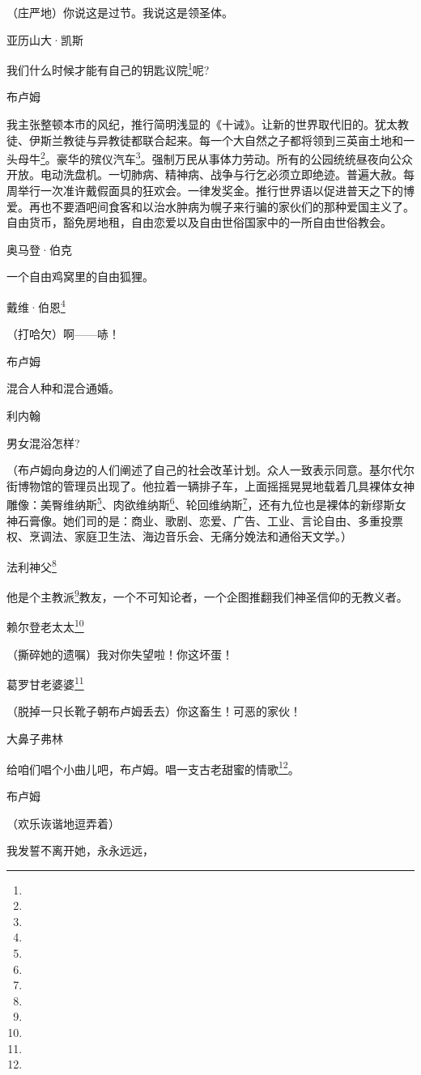 \par （庄严地）你说这是过节。我说这是领圣体。
\par 亚历山大·凯斯
\par 我们什么时候才能有自己的钥匙议院\footnote{}呢?
\par 布卢姆
\par 我主张整顿本市的风纪，推行简明浅显的《十诫》。让新的世界取代旧的。犹太教徒、伊斯兰教徒与异教徒都联合起来。每一个大自然之子都将领到三英亩土地和一头母牛\footnote{}。豪华的殡仪汽车\footnote{}。强制万民从事体力劳动。所有的公园统统昼夜向公众开放。电动洗盘机。一切肺病、精神病、战争与行乞必须立即绝迹。普遍大赦。每周举行一次准许戴假面具的狂欢会。一律发奖金。推行世界语以促进普天之下的博爱。再也不要酒吧间食客和以治水肿病为幌子来行骗的家伙们的那种爱国主义了。自由货币，豁免房地租，自由恋爱以及自由世俗国家中的一所自由世俗教会。
\par 奥马登·伯克
\par 一个自由鸡窝里的自由狐狸。
\par 戴维·伯恩\footnote{}
\par （打哈欠）啊——哧！
\par 布卢姆
\par 混合人种和混合通婚。
\par 利内翰
\par 男女混浴怎样?
\par （布卢姆向身边的人们阐述了自己的社会改革计划。众人一致表示同意。基尔代尔街博物馆的管理员出现了。他拉着一辆排子车，上面摇摇晃晃地载着几具裸体女神雕像：美臀维纳斯\footnote{}、肉欲维纳斯\footnote{}、轮回维纳斯\footnote{}，还有九位也是裸体的新缪斯女神石膏像。她们司的是：商业、歌剧、恋爱、广告、工业、言论自由、多重投票权、烹调法、家庭卫生法、海边音乐会、无痛分娩法和通俗天文学。）
\par 法利神父\footnote{}
\par 他是个主教派\footnote{}教友，一个不可知论者，一个企图推翻我们神圣信仰的无教义者。
\par 赖尔登老太太\footnote{}
\par （撕碎她的遗嘱）我对你失望啦！你这坏蛋！
\par 葛罗甘老婆婆\footnote{}
\par （脱掉一只长靴子朝布卢姆丢去）你这畜生！可恶的家伙！
\par 大鼻子弗林
\par 给咱们唱个小曲儿吧，布卢姆。唱一支古老甜蜜的情歌\footnote{}。
\par 布卢姆
\par （欢乐诙谐地逗弄着）
\par 我发誓不离开她，永永远远，
